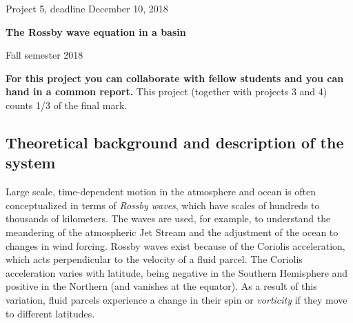 \documentclass[%
oneside,                 %
final,                   %
10pt]{article}
\begin{document}

\newcommand{\exercisesection}[1]{\subsection*{#1}}






\thispagestyle{empty}

\begin{center}
{\LARGE\bf
\begin{spacing}{1.25}
Project 5, deadline  December 10, 2018
\end{spacing}
}
\end{center}


\begin{center}
{\bf The Rossby wave equation in a basin${}^{}$} \\ [0mm]
\end{center}

\begin{center}
\end{center}
    

\begin{center}
Fall semester 2018
\end{center}

\vspace{1cm}


\textbf{For this project you can collaborate with fellow students and you can  hand in a common report.}
This project (together with projects 3 and 4) counts 1/3 of the final mark.


\subsection*{Theoretical background and description of the system}

Large scale, time-dependent motion in the atmosphere and ocean is
often conceptualized in terms of \emph{Rossby waves}, which have scales
of hundreds to thousands of kilometers. The waves are used, for
example, to understand the meandering of the atmospheric Jet Stream
and the adjustment of the ocean to changes in wind forcing. Rossby
waves exist because of the Coriolis acceleration, which acts
perpendicular to the velocity of a fluid parcel. The Coriolis
acceleration varies with latitude, being negative in the Southern
Hemisphere and positive in the Northern (and vanishes at the equator).
As a result of this variation, fluid parcels experience a change in
their spin or \emph{vorticity} if they move to different latitudes.
\end{document}
